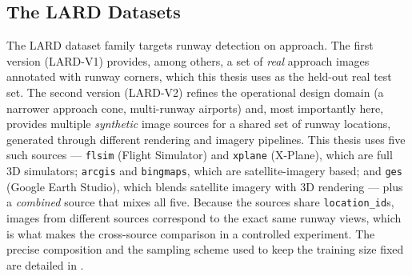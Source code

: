 \subsection{The LARD Datasets}
\label{subsec:bg-lard}
The \ac{LARD} dataset family targets runway detection on approach. The first
version (LARD-V1) provides, among others, a set of \emph{real} approach images
annotated with runway corners, which this thesis uses as the held-out real test set.
The second version (LARD-V2) refines the operational design domain (a narrower
approach cone, multi-runway airports) and, most importantly here, provides multiple
\emph{synthetic} image sources for a shared set of runway locations, generated through
different rendering and imagery pipelines. This thesis uses five such sources ---
\texttt{flsim} (Flight Simulator) and \texttt{xplane} (X-Plane), which are full 3D
simulators; \texttt{arcgis} and \texttt{bingmaps}, which are satellite-imagery based;
and \texttt{ges} (Google Earth Studio), which blends satellite imagery with 3D
rendering --- plus a \emph{combined} source that mixes all five. Because the sources
share \texttt{location\_id}s, images from different sources correspond to the exact
same runway views, which is what makes the cross-source comparison in  a
controlled experiment. The precise composition and the sampling scheme used to keep the
training size fixed are detailed in .
